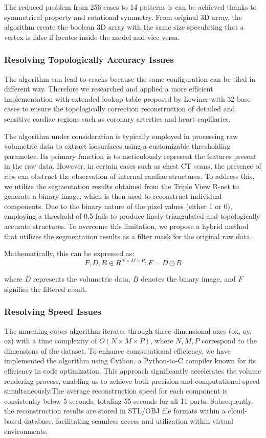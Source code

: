 \documentclass{article}
\begin{document}
\begin{multicols}{2}
The reduced problem from 256 cases to 14 patterns is can be achieved thanks to symmetrical property and rotational symmetry. From original 3D array, the algorithm create the boolean 3D array with the same size speculating that a vertex is false if locates inside the model and vice versa. 

\subsubsection{Resolving Topologically Accuracy Issues}
The algorithm can lead to cracks because the same configuration can be tiled in different way. Therefore we researched and applied a more efficient implementation with extended lookup table proposed by Lewiner with 32 base cases to ensure the topologically correction reconstruction of detailed and sensitive cardiac regions such as coronary arterties and heart capillaries.

The algorithm under consideration is typically employed in processing raw volumetric data to extract isosurfaces using a customizable thresholding parameter. Its primary function is to meticulously represent the features present in the raw data. However, in certain cases such as chest CT scans, the presence of ribs can obstruct the observation of internal cardiac structures. To address this, we utilize the segmentation results obtained from the Triple View R-net to generate a binary image, which is then used to reconstruct individual components. Due to the binary nature of the pixel values (either 1 or 0), employing a threshold of 0.5 fails to produce finely triangulated and topologically accurate structures. To overcome this limitation, we propose a hybrid method that utilizes the segmentation results as a filter mask for the original raw data.

Mathematically, this can be expressed as:
$$F, D, B \in {R}^{N \times M \times P} : F = D \odot B$$

where $D$ represents the volumetric data, $B$ denotes the binary image, and $F$ signifies the filtered result.

\subsubsection{Resolving Speed Issues}
The marching cubes algorithm iterates through three-dimensional axes (ox, oy, oz) with a time complexity of $O(N \times M \times P)$, where $N, M, P$ correspond to the dimensions of the dataset. To enhance computational efficiency, we have implemented the algorithm using Cython, a Python-to-C compiler known for its efficiency in code optimization. This approach significantly accelerates the volume rendering process, enabling us to achieve both precision and computational speed simultaneously.The average reconstruction speed for each component is consistently below 5 seconds, totaling 55 seconds for all 11 parts. Subsequently, the reconstruction results are stored in STL/OBJ file formats within a cloud-based database, facilitating seamless access and utilization within virtual environments.



\end{multicols}
\end{document}
